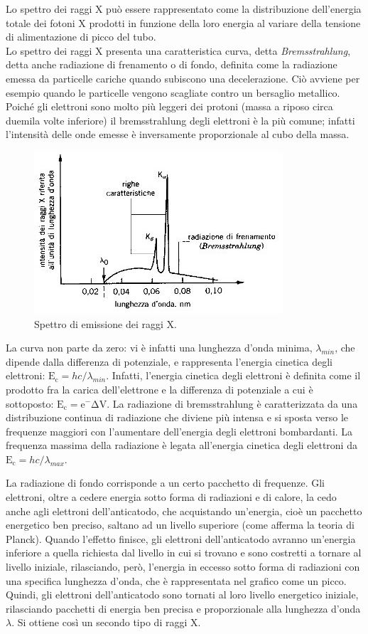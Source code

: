 Lo spettro dei raggi X può essere rappresentato come la distribuzione dell’energia totale dei fotoni X prodotti in funzione della loro energia al variare della tensione di alimentazione di picco del tubo.\\
Lo spettro dei raggi X presenta una caratteristica curva, detta \textit{Bremsstrahlung}, detta anche radiazione di frenamento o di fondo, definita come la radiazione emessa da particelle cariche quando subiscono una decelerazione. Ciò avviene per esempio quando le particelle vengono scagliate contro un bersaglio metallico. Poiché gli elettroni sono molto più leggeri dei protoni (massa a riposo circa duemila volte inferiore) il bremsstrahlung degli elettroni è la più comune; infatti l'intensità delle onde emesse è inversamente proporzionale al cubo della massa.

\begin{figure}[hb]
    \includegraphics[width=0.6 \textwidth]{images/img9.jpg}
    \caption{Spettro di emissione dei raggi X.}
\end{figure}

La curva non parte da zero: vi è infatti una lunghezza d’onda minima, $\lambda_{min}$, che dipende dalla differenza di potenziale, e rappresenta l’energia cinetica degli elettroni: $\mathrm{E_c}=hc/\lambda_{min}$. Infatti, l’energia cinetica degli elettroni è definita come il prodotto fra la carica dell’elettrone e la differenza di potenziale a cui è sottoposto: $\mathrm{E_c = e^-\Delta V}$.
La radiazione di bremsstrahlung è caratterizzata da una distribuzione continua di radiazione che diviene più intensa e si sposta verso le frequenze maggiori con l'aumentare dell'energia degli elettroni bombardanti. La frequenza massima della radiazione è legata all'energia cinetica degli elettroni da $\mathrm{E_c}= hc/\lambda_{max}$.

La radiazione di fondo corrisponde a un certo pacchetto di frequenze.
Gli elettroni, oltre a cedere energia sotto forma di radiazioni e di calore, la cedo anche agli elettroni dell’anticatodo, che acquistando un’energia, cioè un pacchetto energetico ben preciso, saltano ad un livello superiore (come afferma la teoria di Planck). Quando l’effetto finisce, gli elettroni dell’anticatodo avranno un’energia inferiore a quella richiesta dal livello in cui si trovano e sono costretti a tornare al livello iniziale, rilasciando, però, l’energia in eccesso sotto forma di radiazioni con una specifica lunghezza d’onda, che è rappresentata nel grafico come un picco. Quindi, gli elettroni dell’anticatodo sono tornati al loro livello energetico iniziale, rilasciando pacchetti di energia ben precisa e proporzionale alla lunghezza d’onda $\lambda$. Si ottiene così un secondo tipo di raggi X.

